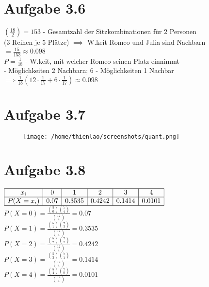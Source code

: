 \documentclass{article}
\begin{document}
		\section*{Aufgabe 3.6}
		$(\frac{18}{2}) = 153$ - Gesamtzahl der Sitzkombinationen für 2 Personen \\
		 (3 Reihen je 5 Plätze) $\implies$ W.keit Romeo und Julia sind Nachbarn $=\frac{15}{153} \approx 0.098$ \\
		\newline
		$P=\frac{1}{18}$ - W.keit, mit welcher Romeo  seinen Platz einnimmt \\
		 - Möglichkeiten 2 Nachbarn;  6 - Möglichkeiten 1 Nachbar $\implies \frac{1}{18}(12 \cdot \frac{1}{17} + 6 \cdot \frac{1}{17}) \approx 0.098$
		
		\section*{Aufgabe 3.7}
		\begin{figure} [h]
			\texttt{[image: /home/thienlao/screenshots/quant.png]}
		\end{figure}
		
		\section*{Aufgabe 3.8}
		\(
		\begin{array}{|c|c|c|c|c|c|c|c|}
			\hline
			x_{i} & 0 & 1 & 2 & 3 & 4 \\
			\hline
			P(X=x_{i}) & 0.07 & 0.3535 & 0.4242 & 0.1414 & 0.0101 \\
			\hline
		\end{array}
		\) \\
		\vspace{5pt}
		\newline
		$P(X=0)=\frac{\binom{5}{0}\binom{7}{4}}{\binom{12}{4}}=0.07$ \\
		\newline
		$P(X=1)=\frac{\binom{5}{1}\binom{7}{3}}{\binom{12}{4}}=0.3535$ \\
		\newline	$P(X=2)=\frac{\binom{5}{2}\binom{7}{2}}{\binom{12}{4}}=0.4242$ \\
		\newline
		$P(X=3)=\frac{\binom{5}{3}\binom{7}{1}}{\binom{12}{4}}=0.1414$ \\
		\newline
		$P(X=4)=\frac{\binom{5}{4}\binom{7}{0}}{\binom{12}{4}}=0.0101$ 
		
\end{document}

